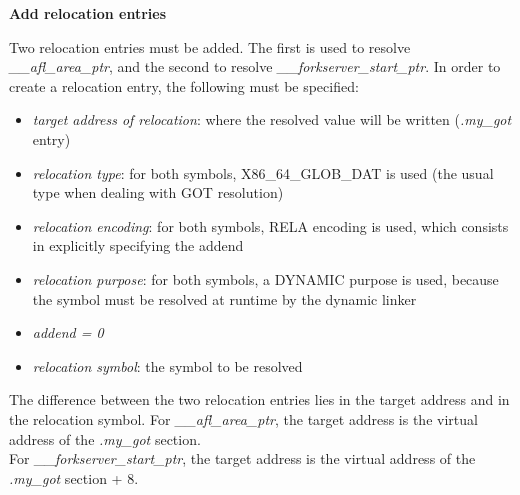\begin{center}
\textbf{Add relocation entries}    
\end{center}
Two relocation entries must be added. The first is used to resolve \textit{\_\_afl\_area\_ptr}, and the second to resolve
\textit{\_\_forkserver\_start\_ptr}.
In order to create a relocation entry, the following must be specified:
\begin{itemize}
    \item \textit{target address of relocation}: where the resolved value will be written (\textit{.my\_got} entry)
    \item \textit{relocation type}: for both symbols, X86\_64\_GLOB\_DAT is used (the usual type when dealing with \gls{GOT} resolution)
    \item \textit{relocation encoding}: for both symbols, RELA encoding is used, which consists in explicitly specifying the addend
    \item \textit{relocation purpose}: for both symbols, a DYNAMIC purpose is used, because the symbol must be resolved at runtime by the dynamic linker
    \item \textit{addend = 0}
    \item \textit{relocation symbol}: the symbol to be resolved
\end{itemize}
The difference between the two relocation entries lies in the target address and in the relocation symbol.
For \textit{\_\_afl\_area\_ptr}, the target address is the virtual address of the \textit{.my\_got} section.\\
For \textit{\_\_forkserver\_start\_ptr}, the target address is the virtual address of the \textit{.my\_got} section + 8.

